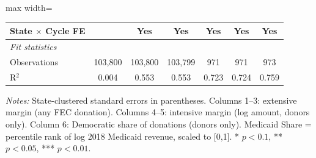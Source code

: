 \begin{table}[htbp]
\begin{adjustbox}{max width=\textwidth}
\begin{tabular}{lcccccc}
      State $\times$ Cycle FE                         &          & Yes            & Yes            & Yes      & Yes      & Yes\\
      \midrule
      \emph{Fit statistics}\\
      Observations                                    & 103,800  & 103,800        & 103,799        & 971      & 971      & 973\\
      R$^2$                                           & 0.004    & 0.553          & 0.553          & 0.723    & 0.724    & 0.759\\
      \midrule \midrule
   \end{tabular}
   \end{adjustbox}

   \par \raggedright \small
   \textit{Notes:} State-clustered standard errors in parentheses.
   Columns 1--3: extensive margin (any FEC donation). Columns 4--5: intensive margin (log amount, donors only). Column 6: Democratic share of donations (donors only).
   Medicaid Share = percentile rank of log 2018 Medicaid revenue, scaled to [0,1].
   * $p<0.1$, ** $p<0.05$, *** $p<0.01$.
\end{table}


